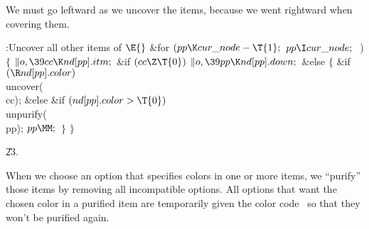 We must go leftward as we uncover the items, because we went
rightward when covering them.

\Y\B\4:Uncover all other items of \X${}\E{}$\6
\&{for} ${}(\\{pp}\K\\{cur\_node}-\T{1};{}$ ${}\\{pp}\I\\{cur\_node};{}$ \,)\5
${}\{{}$\1\6
${}\|o,\39\\{cc}\K\\{nd}[\\{pp}].\\{itm};{}$\6
\&{if} ${}(\\{cc}\Z\T{0}){}$\1\5
${}\|o,\39\\{pp}\K\\{nd}[\\{pp}].\\{down};{}$\2\6
\&{else}\5
${}\{{}$\1\6
\&{if} ${}(\R\\{nd}[\\{pp}].\\{color}){}$\1\5
\\{uncover}(\\{cc});\2\6
\&{else} \&{if} ${}(\\{nd}[\\{pp}].\\{color}>\T{0}){}$\1\5
\\{unpurify}(\\{pp});\2\6
${}\\{pp}\MM;{}$\6
\4${}\}{}$\2\6
\4${}\}{}$\2\par
\U23.\fi

When we choose an option that specifies colors in one or more items,
we ``purify'' those items by removing all incompatible options.
All options that want the chosen color in a purified item are temporarily
given the color code~ so that they won't be purified again.

